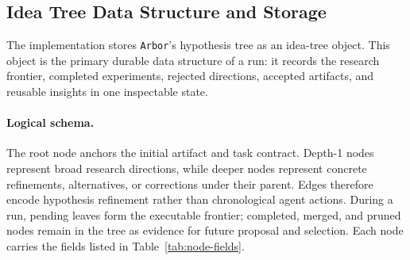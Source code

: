 \documentclass{llmxive}
\providecommand{\arbor}{\texttt{Arbor}}
\begin{document}
\subsection{Idea Tree Data Structure and Storage}
\label{app:idea-tree-storage}

The implementation stores \arbor{}'s hypothesis tree as an idea-tree object.
This object is the primary durable data structure of a run: it records the
research frontier, completed experiments, rejected directions, accepted
artifacts, and reusable insights in one inspectable state.

\paragraph{Logical schema.}
The root node anchors the initial artifact and task contract. Depth-1 nodes
represent broad research directions, while deeper nodes represent concrete
refinements, alternatives, or corrections under their parent. Edges therefore
encode hypothesis refinement rather than chronological agent actions. During a
run, pending leaves form the executable frontier; completed, merged, and pruned
nodes remain in the tree as evidence for future proposal and selection.
Each node carries the fields listed in Table~\ref{tab:node-fields}.
\end{document}
